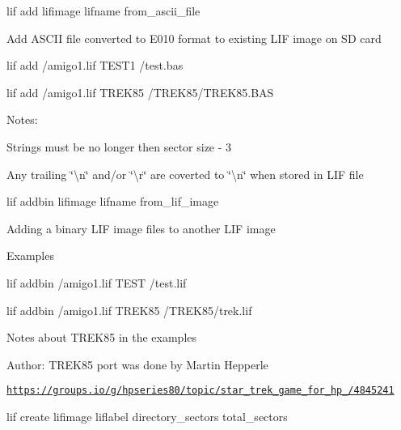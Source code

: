 \begin{DoxyItemize}
\item lif add lifimage lifname from\+\_\+ascii\+\_\+file
\begin{DoxyItemize}
\item Add A\+S\+C\+II file converted to E010 format to existing L\+IF image on SD card
\begin{DoxyItemize}
\item lif add /amigo1.lif T\+E\+S\+T1 /test.bas
\item lif add /amigo1.lif T\+R\+E\+K85 /\+T\+R\+E\+K85/\+T\+R\+E\+K85.B\+AS
\end{DoxyItemize}
\item Notes\+:
\begin{DoxyItemize}
\item Strings must be no longer then sector size -\/ 3
\item Any trailing \char`\"{}\textbackslash{}n\char`\"{} and/or \char`\"{}\textbackslash{}r\char`\"{} are coverted to \char`\"{}\textbackslash{}n\char`\"{} when stored in L\+IF file
\end{DoxyItemize}
\end{DoxyItemize}
\item lif addbin lifimage lifname from\+\_\+lif\+\_\+image
\begin{DoxyItemize}
\item Adding a binary L\+IF image files to another L\+IF image
\item Examples
\begin{DoxyItemize}
\item lif addbin /amigo1.lif T\+E\+ST /test.lif
\item lif addbin /amigo1.lif T\+R\+E\+K85 /\+T\+R\+E\+K85/trek.lif
\end{DoxyItemize}
\item Notes about T\+R\+E\+K85 in the examples
\begin{DoxyItemize}
\item Author\+: T\+R\+E\+K85 port was done by Martin Hepperle
\item \href{https://groups.io/g/hpseries80/topic/star_trek_game_for_hp_85/4845241}{\tt https\+://groups.\+io/g/hpseries80/topic/star\+\_\+trek\+\_\+game\+\_\+for\+\_\+hp\+\_/4845241}
\end{DoxyItemize}
\end{DoxyItemize}
\item lif create lifimage liflabel directory\+\_\+sectors total\+\_\+sectors
\begin{DoxyItemize}

\end{DoxyItemize}
\end{DoxyItemize}
